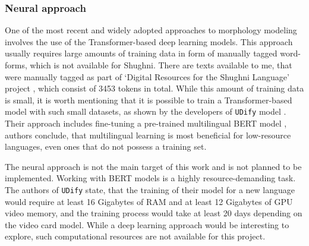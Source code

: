 \subsubsection{Neural approach}
\par One of the most recent and widely adopted approaches to morphology modeling involves the use of the Transformer-based deep learning models. This approach usually requires large amounts of training data in form of manually tagged word-forms, which is not available for Shughni. There are texts available to me, that were manually tagged as part of `Digital Resources for the Shughni Language' project \parencite{makarov_digital_2022}, which consist of 3453 tokens in total. While this amount of training data is small, it is worth mentioning that it is possible to train a Transformer-based model with such small datasets, as shown by the developers of \texttt{UDify} model \parencite{kondratyuk_straka_model_2019}. Their approach includes fine-tuning a pre-trained multilingual BERT model \parencite{devlin-etal-2019-bert}, authors conclude, that multilingual learning is most beneficial for low-resource languages, even ones that do not possess a training set. 
\par The neural approach is not the main target of this work and is not planned to be implemented. Working with BERT models is a highly resource-demanding task. The authors of \texttt{UDify} state, that the training of their model for a new language would require at least 16 Gigabytes of RAM and at least 12 Gigabytes of GPU video memory, and the training process would take at least 20 days depending on the video card model. While a deep learning approach would be interesting to explore, such computational resources are not available for this project.
